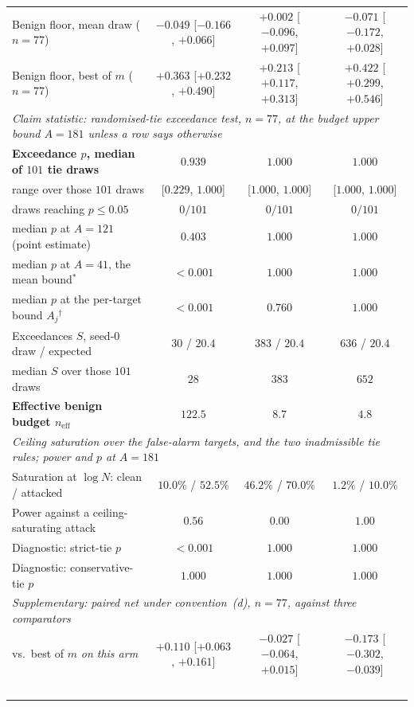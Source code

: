 \begin{table}[t]
\begin{tabular}{lccc}
Benign floor, mean draw ($n{=}77$)       & $-0.049$ [$-0.166$, $+0.066$] & $+0.002$ [$-0.096$, $+0.097$] & $-0.071$ [$-0.172$, $+0.028$] \\
Benign floor, best of $m$ ($n{=}77$)     & $+0.363$ [$+0.232$, $+0.490$] & $+0.213$ [$+0.117$, $+0.313$] & $+0.422$ [$+0.299$, $+0.546$] \\
\midrule
\multicolumn{4}{l}{\emph{Claim statistic: randomised-tie exceedance test, $n{=}77$, at the budget upper bound $A{=}181$ unless a row says otherwise}} \\
\textbf{Exceedance $p$, median of $101$ tie draws} & $\mathbf{0.939}$ & $\mathbf{1.000}$ & $\mathbf{1.000}$ \\
\quad range over those $101$ draws       & [$0.229$, $1.000$] & [$1.000$, $1.000$] & [$1.000$, $1.000$] \\
\quad draws reaching $p{\leq}0.05$       & $0/101$ & $0/101$ & $0/101$ \\
\quad median $p$ at $A{=}121$ (point estimate) & $0.403$ & $1.000$ & $1.000$ \\
\quad median $p$ at $A{=}41$, the mean bound$^{\ast}$ & $<0.001$ & $1.000$ & $1.000$ \\
\quad median $p$ at the per-target bound $A_j$$^{\dagger}$ & $<0.001$ & $0.760$ & $1.000$ \\
Exceedances $S$, seed-$0$ draw / expected & $30$ / $20.4$ & $383$ / $20.4$ & $636$ / $20.4$ \\
\quad median $S$ over those $101$ draws  & $28$ & $383$ & $652$ \\
\textbf{Effective benign budget $n_{\mathrm{eff}}$} & $\mathbf{122.5}$ & $\mathbf{8.7}$ & $\mathbf{4.8}$ \\
\midrule
\multicolumn{4}{l}{\emph{Ceiling saturation over the false-alarm targets, and the two inadmissible tie rules; power and $p$ at $A{=}181$}} \\
Saturation at $\log N$: clean / attacked  & $10.0\%$ / $52.5\%$ & $46.2\%$ / $70.0\%$ & $1.2\%$ / $10.0\%$ \\
Power against a ceiling-saturating attack & $0.56$ & $\mathbf{0.00}$ & $1.00$ \\
Diagnostic: strict-tie $p$               & $<0.001$ & $1.000$ & $1.000$ \\
Diagnostic: conservative-tie $p$         & $1.000$ & $1.000$ & $1.000$ \\
\midrule
\multicolumn{4}{l}{\emph{Supplementary: paired net under convention~(d), $n{=}77$, against three comparators}} \\
vs.\ best of $m$ \emph{on this arm}      & $+0.110$ [$+0.063$, $+0.161$] & $-0.027$ [$-0.064$, $+0.015$] & $-0.173$ [$-0.302$, $-0.039$] \\
$$
\end{tabular}
\end{table}
